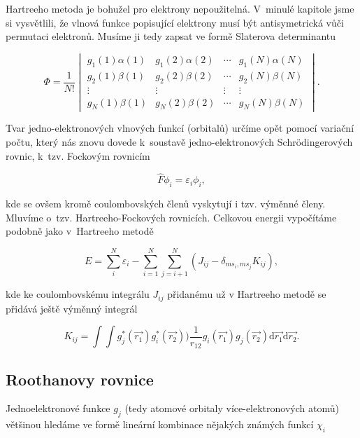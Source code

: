 Hartreeho metoda je bohužel pro elektrony nepoužitelná. V~minulé kapitole jsme si vysvětlili, že vlnová funkce popisující elektrony musí být antisymetrická vůči permutaci elektronů. Musíme ji tedy zapsat ve formě Slaterova determinantu

\begin{equation}
\Phi = \frac{1}{N!}
\begin{vmatrix}
g_1(1) \alpha (1) & g_1(2) \alpha (2) & \cdots & g_1(N) \alpha (N) \\
g_2(1) \beta (1) & g_2(2) \beta (2) & \cdots & g_2(N) \beta (N) \\
\vdots & \vdots & \vdots & \vdots \\
g_N(1) \beta (1) & g_N(2) \beta (2) & \cdots &g_N(N) \beta (N)
\end{vmatrix}.
\label{rov:VE-48}
\end{equation}


Tvar jedno-elektronových vlnových funkcí (orbitalů) určíme opět pomocí variační počtu, který nás znovu dovede k~soustavě jedno-elektronových  Schr\"odingerových rovnic, k~tzv. Fockovým rovnicím

\begin{equation}
\hat{F}\phi_i = \varepsilon_i \phi_i,
\label{rov:VE-49}
\end{equation}

\noindent kde se ovšem kromě coulombovských členů vyskytují i tzv. výměnné členy. Mluvíme o~tzv. Hartreeho-Fockových rovnicích. Celkovou energii vypočítáme podobně jako v~Hartreeho metodě

\begin{equation}
E = \sum_{i}^N \varepsilon_i - \sum_{i=1}^N \sum_{j=i+1}^N (J_{ij} - \delta_{ms_i,ms_j} K_{ij}),
\label{rov:VE-50}
\end{equation}

\noindent kde ke coulombovskému integrálu $J_{ij}$ přidanému už v Hartreeho metodě se přidává ještě výměnný integrál


\begin{equation}
K_{ij} = \int \int g_j^{\ast} (\vec{r_1}) g_i^{\ast}(\vec{r_2})) \frac{1}{r_{12}} g_i(\vec{r_1}) g_j(\vec{r_2}) \mathrm{d}\vec{r_1} \mathrm{d}\vec{r_2}.
\label{rov:VE-51}
\end{equation}


\subsection{Roothanovy rovnice}
Jednoelektronové funkce $g_j$ (tedy atomové orbitaly více-elektronových atomů) většinou hledáme ve formě lineární kombinace nějakých známých funkcí $\chi_i$

